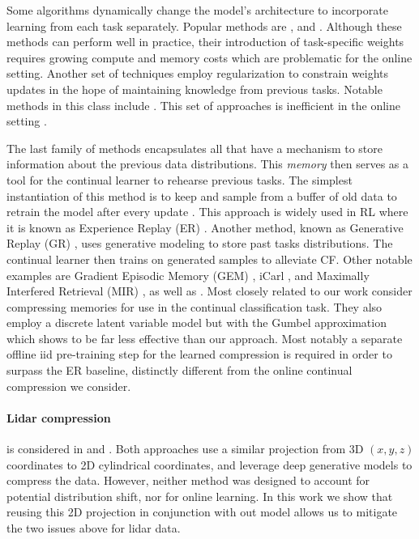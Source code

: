 \documentclass[colorinlistoftodos]{article} %
\begin{document}
Some algorithms dynamically change the model’s architecture to incorporate learning from each task separately. Popular methods are \citet{rusu2016progressive}, \citet{li2018learning} and  \citet{fernando2017pathnet}. Although these methods can perform well in practice, their introduction of task-specific weights requires growing compute and memory costs which are problematic for the online setting. %
Another set of techniques employ regularization to constrain weights updates in the hope of maintaining knowledge from previous tasks. Notable methods in this class include \citep{kirkpatrick2017overcoming,huszar2017quadratic,zenke2017continual,nguyen2017variational, chaudhry2018riemannian}. This set of approaches is inefficient in the online setting \cite{chaudhry2019continual}.

The last family of methods encapsulates all that have a mechanism to store information about the previous data distributions. This \textit{memory} then serves as a tool for the continual learner to rehearse previous tasks. The simplest instantiation of this method is to keep and sample from a buffer of old data to retrain the model after every update \citep{chaudhry2019continual}. This approach is widely used in RL where it is known as Experience Replay (ER) \citep{lin1993reinforcement}. Another method, known as Generative Replay (GR) \citep{shin2017continual}, uses generative modeling to store past tasks distributions. The continual learner then trains on generated samples to alleviate CF. Other notable examples are Gradient Episodic Memory (GEM) \citep{lopez2017gradient}, iCarl \citep{rebuffi2017icarl}, and Maximally Interfered Retrieval (MIR) \cite{aljundi2019online}, as well as \citep{aljundi2018Online, hu2018overcoming}. Most closely related to our work \cite{scalable2017} consider compressing memories for use in the continual classification task. They also employ a discrete latent variable model but with the Gumbel approximation which shows to be far less effective than our approach. Most notably a separate offline iid pre-training step for the learned compression is required in order to surpass the ER baseline, distinctly different from the online continual compression we consider. 

\paragraph{Lidar compression} is considered in \cite{tu2019point} and \cite{caccia2018deep}. Both approaches use a similar projection from 3D $(x,y,z)$ coordinates to 2D cylindrical coordinates, and leverage deep generative models to compress the data. However, neither method was designed to account for potential distribution shift, nor for online learning. In this work we show that reusing this 2D projection in conjunction with out model allows us to mitigate the two issues above for lidar data. 
\end{document}
